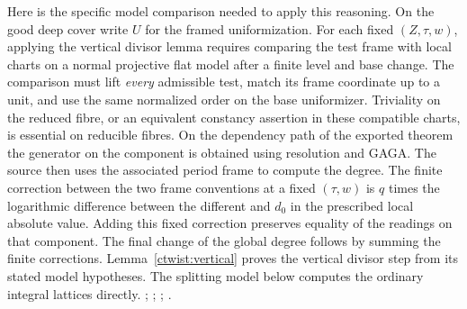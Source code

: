 Here is the specific model comparison needed to apply this reasoning.
On the good deep cover write \(U\) for the framed uniformization.
For each fixed \((Z,\tau,w)\), applying the vertical divisor lemma
requires comparing the test frame with local charts on a normal
projective flat model after a finite level and base change. The
comparison must lift
\emph{every} admissible test, match its frame coordinate up to a
unit, and use the same normalized order on the base uniformizer.
Triviality on the reduced fibre, or an equivalent constancy assertion
in these compatible charts, is essential on reducible fibres.
On the dependency path of the exported theorem the generator on
the component is obtained using resolution and GAGA. The source
then uses the associated period frame to compute the degree.
The finite correction between the two frame conventions at a fixed
\((\tau,w)\) is \(q\) times the logarithmic difference between the
different and \(d_0\) in the prescribed local absolute value. Adding
this fixed correction preserves equality of the readings on that
component. The final change of the global degree follows by summing
the finite corrections. Lemma~\ref{ctwist:vertical} proves the
vertical divisor step from its stated model hypotheses. The splitting
model below computes the ordinary integral lattices directly.
;
;
;
.

